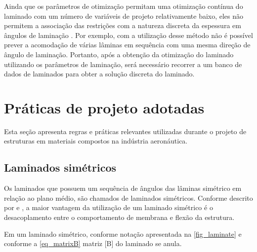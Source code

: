 Ainda que os parâmetros de otimização permitam uma otimização contínua do laminado com um número de variáveis de projeto relativamente baixo, eles não permitem a associação das restrições com a natureza discreta da espessura em ângulos de laminação \cite{liu2004maximization}. Por exemplo, com a utilização desse método não é possível prever a acomodação de várias lâminas em sequência com uma mesma direção de ângulo de laminação. Portanto, após a obtenção da otimização do laminado utilizando os parâmetros de laminação, será necessário recorrer a um banco de dados de laminados para obter a solução discreta do laminado.



\section{Práticas de projeto adotadas}
Esta seção apresenta regras e práticas relevantes utilizadas durante o projeto de estruturas em materiais compostos na indústria aeronáutica.

\subsection{Laminados simétricos}
Os laminados que possuem um sequência	de ângulos das lâminas simétrico em relação ao plano médio, são chamados de laminados simétricos. Conforme descrito por \cite{mil2002handbook} e \cite{niucomposite}, a maior vantagem da utilização de um laminado simétrico é o desacoplamento entre o comportamento de membrana e flexão da estrutura.

Em um laminado simétrico, conforme notação apresentada na \autoref{fig_laminate} e conforme a \autoref{eq_matrixB} matriz [B] do laminado se anula.

